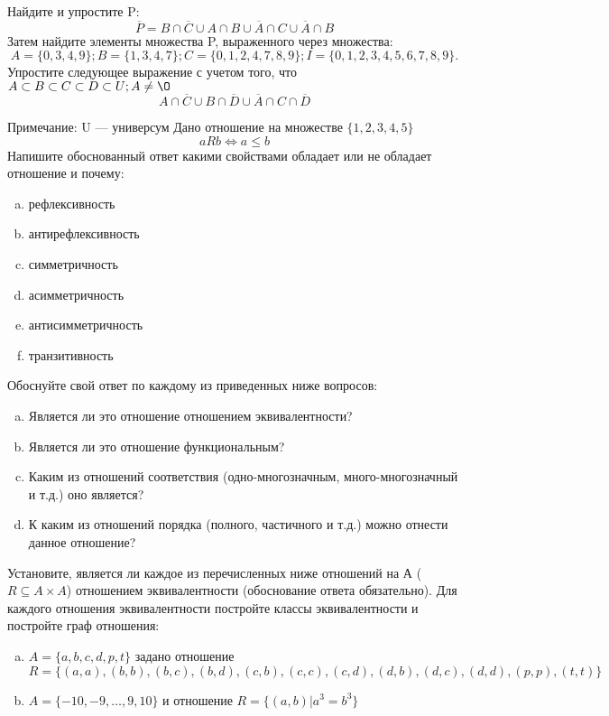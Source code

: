 \documentclass[10pt]{exam}
\begin{document}
\begin{questions}
\question
Найдите и упростите P:
\begin{equation*}
\overline{P} = B \cap \overline{C} \cup A \cap B \cup \overline{A} \cap C \cup \overline{A} \cap B
\end{equation*}
Затем найдите элементы множества P, выраженного через множества:
\begin{equation*}
A = \{0, 3, 4, 9\}; 
B = \{1, 3, 4, 7\};
C = \{0, 1, 2, 4, 7, 8, 9\};
I = \{0, 1, 2, 3, 4, 5, 6, 7, 8, 9\}.
\end{equation*}\question
Упростите следующее выражение с учетом того, что $A\subset B \subset C \subset D \subset U; A \neq \O$
\begin{equation*}
A \cap  \overline{C} \cup B \cap \overline{D} \cup  \overline{A} \cap C \cap  \overline{D}
\end{equation*}

Примечание: U — универсум\question
Дано отношение на множестве $\{1, 2, 3, 4, 5\}$ 
\begin{equation*}
aRb \iff a \leq b
\end{equation*}
Напишите обоснованный ответ какими свойствами обладает или не обладает отношение и почему:   
\begin{enumerate} [a)]\setcounter{enumi}{0}
\item рефлексивность
\item антирефлексивность
\item симметричность
\item асимметричность
\item антисимметричность
\item транзитивность
\end{enumerate}

Обоснуйте свой ответ по каждому из приведенных ниже вопросов:
\begin{enumerate} [a)]\setcounter{enumi}{0}
    \item Является ли это отношение отношением эквивалентности?
    \item Является ли это отношение функциональным?
    \item Каким из отношений соответствия (одно-многозначным, много-многозначный и т.д.) оно является?
    \item К каким из отношений порядка (полного, частичного и т.д.) можно отнести данное отношение?
\end{enumerate}


\question
Установите, является ли каждое из перечисленных ниже отношений на А ($R \subseteq A \times A$) отношением эквивалентности (обоснование ответа обязательно). Для каждого отношения эквивалентности постройте классы 
эквивалентности и постройте граф отношения:
\begin{enumerate} [a)]\setcounter{enumi}{0}
\item $A = \{a, b, c, d, p, t\}$ задано отношение $R = \{(a, a), (b, b), (b, c), (b, d), (c, b), (c, c), (c, d), (d, b), (d, c), (d, d), (p,p), (t,t)\}$
\item $A = \{-10, -9, … , 9, 10\}$ и отношение $R = \{(a,b)|a^{3} = b^{3}\}$


\end{enumerate}
\end{questions}
\end{document}
